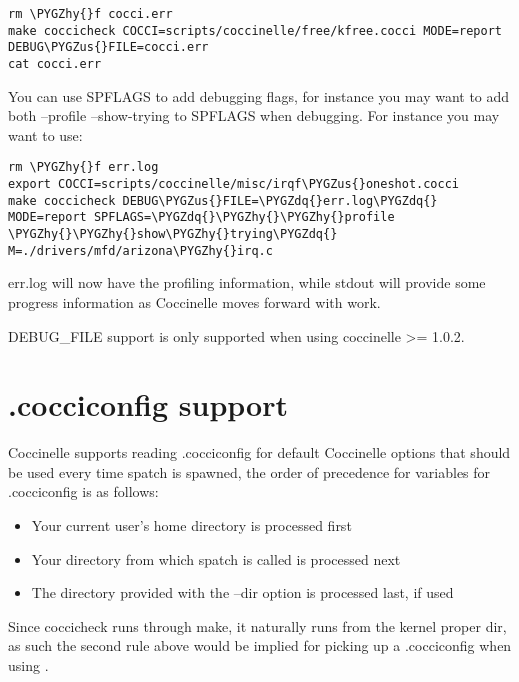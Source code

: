 \documentclass[a4paper,8pt,english]{sphinxmanual}
\def\PYGZus{\char`\_}
\def\PYGZhy{\char`\-}
\def\PYGZdq{\char`\"}
\begin{document}
\begin{Verbatim}[commandchars=\\\{\}]
rm \PYGZhy{}f cocci.err
make coccicheck COCCI=scripts/coccinelle/free/kfree.cocci MODE=report DEBUG\PYGZus{}FILE=cocci.err
cat cocci.err
\end{Verbatim}

You can use SPFLAGS to add debugging flags, for instance you may want to
add both --profile --show-trying to SPFLAGS when debugging. For instance
you may want to use:

\begin{Verbatim}[commandchars=\\\{\}]
rm \PYGZhy{}f err.log
export COCCI=scripts/coccinelle/misc/irqf\PYGZus{}oneshot.cocci
make coccicheck DEBUG\PYGZus{}FILE=\PYGZdq{}err.log\PYGZdq{} MODE=report SPFLAGS=\PYGZdq{}\PYGZhy{}\PYGZhy{}profile \PYGZhy{}\PYGZhy{}show\PYGZhy{}trying\PYGZdq{} M=./drivers/mfd/arizona\PYGZhy{}irq.c
\end{Verbatim}

err.log will now have the profiling information, while stdout will
provide some progress information as Coccinelle moves forward with
work.

DEBUG\_FILE support is only supported when using coccinelle \textgreater{}= 1.0.2.


\section{.cocciconfig support}
\label{dev-tools/coccinelle:cocciconfig-support}
Coccinelle supports reading .cocciconfig for default Coccinelle options that
should be used every time spatch is spawned, the order of precedence for
variables for .cocciconfig is as follows:
\begin{itemize}
\item {} 
Your current user's home directory is processed first

\item {} 
Your directory from which spatch is called is processed next

\item {} 
The directory provided with the --dir option is processed last, if used

\end{itemize}

Since coccicheck runs through make, it naturally runs from the kernel
proper dir, as such the second rule above would be implied for picking up a
.cocciconfig when using .
\end{document}
